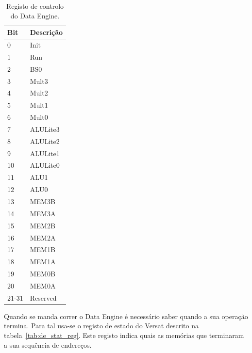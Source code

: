 \begin{table}[!htbp]
   \caption{Registo de controlo do Data Engine.}
  \centering
    \begin{tabular}{|p{1.5cm}|p{7cm}|}
    \hline 
    {\bf Bit} & {\bf Descrição} \\
    \hline \hline 
     0 & Init \\
    \hline
     1 & Run \\
    \hline
     2 & BS0 \\
    \hline
     3 & Mult3 \\
    \hline
     4 &  Mult2\\
    \hline
     5 &  Mult1  \\
    \hline
     6 & Mult0 \\
    \hline
     7 & ALULite3 \\
    \hline
     8 & ALULite2 \\
    \hline
     9 &  ALULite1\\
    \hline
     10 & ALULite0 \\
    \hline
     11 & ALU1 \\
    \hline
     12 & ALU0\\
    \hline
     13 & MEM3B \\
    \hline
     14 & MEM3A \\
    \hline
     15 &  MEM2B\\
    \hline
     16 &  MEM2A\\
    \hline
     17 &  MEM1B\\
    \hline
     18 &  MEM1A\\
    \hline
     19 &  MEM0B\\
    \hline
     20 &  MEM0A\\
    \hline
     21-31 & Reserved \\
    \hline
    \end{tabular}
  \label{tab:de_ctr_reg}
\end{table}

Quando se manda correr o Data Engine é necessário saber quando a sua operação termina. Para tal usa-se o registo de estado do Versat descrito na tabela~\ref{tab:de_stat_reg}. Este registo indica quais as memórias que terminaram a sua sequência de endereços.


